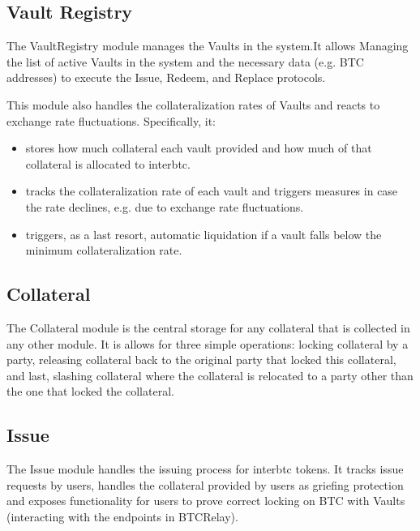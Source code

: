 \documentclass[a4paper,10pt,english]{sphinxmanual}
\begin{document}
\subsection{Vault Registry}
\label{\detokenize{intro/architecture:vault-registry}}
The VaultRegistry module manages the Vaults in the system.It allows Managing the list of active Vaults in the system and the necessary data (e.g. BTC addresses) to execute the Issue, Redeem, and Replace protocols.

This module also handles the collateralization rates of Vaults and reacts to exchange rate fluctuations.
Specifically, it:
\begin{itemize}
\item {} 
stores how much collateral each vault provided and how much of that collateral is allocated to interbtc.

\item {} 
tracks the collateralization rate of each vault and triggers measures in case the rate declines, e.g. due to exchange rate fluctuations.

\item {} 
triggers, as a last resort, automatic liquidation if a vault falls below the minimum collateralization rate.

\end{itemize}


\subsection{Collateral}
\label{\detokenize{intro/architecture:collateral}}
The Collateral module is the central storage for any collateral that is collected in any other module.
It is allows for three simple operations: locking collateral by a party, releasing collateral back to the original party that locked this collateral, and last, slashing collateral where the collateral is relocated to a party other than the one that locked the collateral.


\subsection{Issue}
\label{\detokenize{intro/architecture:issue}}
The Issue module handles the issuing process for interbtc tokens. It tracks issue requests by users, handles the collateral provided by users as griefing protection and exposes functionality for users to prove correct locking on BTC with Vaults (interacting with the endpoints in BTC\sphinxhyphen{}Relay).
\end{document}
